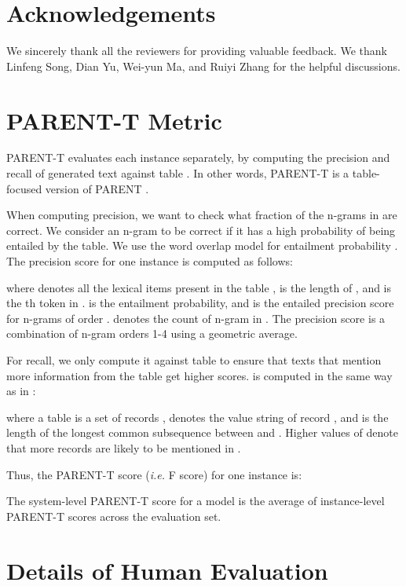 \documentclass[11pt,a4paper]{article}
\begin{document}
\section*{Acknowledgements}

We sincerely thank all the reviewers for providing valuable feedback. We thank Linfeng Song, Dian Yu,  Wei-yun Ma, and Ruiyi Zhang for the helpful discussions. 

\nocite{song2018graph}



\newpage\clearpage\newpage
\appendix
\section{PARENT-T Metric} \label{app:parent-t}
PARENT-T evaluates each instance  separately, by computing the precision and recall of generated text  against table . In other words, PARENT-T is a table-focused version of PARENT \cite{Dhingra2019}.

When computing precision, we want to check what fraction of the n-grams in  are correct. We consider an n-gram  to be correct if it has a high probability of being entailed by the table.
We use the word overlap model for entailment probability .
The precision score  for one instance is computed as follows:

where  denotes all the lexical items present in the table ,  is the length of , and  is the th token in .  is the entailment probability, and  is the entailed precision score for n-grams of order .  denotes the count of n-gram  in . The precision score  is a combination of n-gram orders 1-4 using a geometric average.

For recall, we only compute it against table to ensure that texts that mention more information from the table get higher scores. 
 is computed in the same way as in \citet{Dhingra2019}:

where a table is a set of records ,  denotes the value string of record , and  is the length of the longest common subsequence between  and . Higher values of  denote that more records are likely to be mentioned in .

Thus, the PARENT-T score (\textit{i.e.} F score) for one instance is:

The system-level PARENT-T score for a model  is the average of instance-level PARENT-T scores across the evaluation set.


\section{Details of Human Evaluation} \label{app:human_evaluation}
\end{document}
